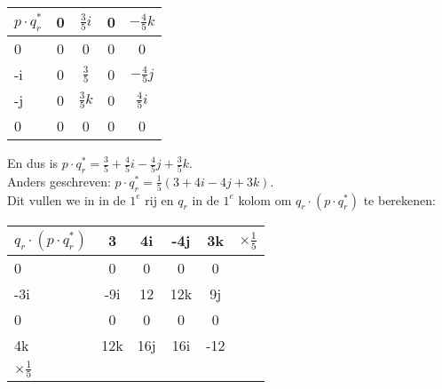 \begin{center}
	\begin{tabular}{ | l || c | c |c |c |}
		\hline
		$ p\cdot q^*_r $  & 0 & $  \frac{3}{5}i  $  & 0 & $ - \frac{4}{5}k $  \\ \hline \hline
		0                 & 0 & 0                          & 0    & 0  \\ \hline
		-i                & 0 &  $  \frac{3}{5}  $  & 0   & $ - \frac{4}{5}j $\\ \hline
		-j                & 0 &  $  \frac{3}{5}k $  & 0     & $  \frac{4}{5}i $\\ \hline
		0                 & 0 & 0                          & 0   & 0 \\
		\hline 
	\end{tabular}
\end{center}
En dus is $ p\cdot q^*_r = \frac{3}{5}  + \frac{4}{5}i - \frac{4}{5}j  + \frac{3}{5}k. $
\\Anders geschreven:  $ p\cdot q^*_r = \frac{1}{5}  (3 + 4i - 4j  + 3k). $ 
\\Dit vullen we  in in de $ 1^e $ rij en $ q_r $ in de $ 1^e  $ kolom om $ q_r\cdot (p\cdot q^*_r) $ te berekenen:\\
\begin{center}
	\begin{tabular}{ | l || c | c |c |c |l}
		\hline
		$ q_r\cdot (p\cdot q^*_r) $  & 3 & 4i   & -4j & 3k &  $ \times  \frac{1}{5} $\\ \hline \hline
		0                         & 0    & 0    & 0       & 0 & \\ \hline
		-3i                      & -9i   & 12  & 12k    & 9j & \\ \hline
		0                         & 0    &  0   & 0       & 0&\\ \hline
		4k                       & 12k & 16j  & 16i   & -12 & \\ 
		\hline 
		$ \times  \frac{1}{5} $
	\end{tabular}
\end{center}
